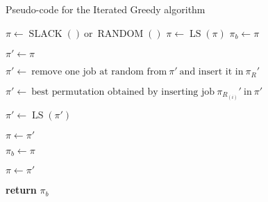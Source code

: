 

\begin{algorithm}
\caption{Pseudo-code for the Iterated Greedy algorithm}
\label{app:alg:ig}
\begin{algorithmic}
	\State $\pi \gets \operatorname{SLACK}() ~\text{or}~ \operatorname{RANDOM}()$
	\State $\pi \gets \operatorname{LS}(\pi)$
	\State $\pi_b \gets \pi$

		\State $\pi' \gets \pi$

			\State $\pi' \gets ~\text{remove one job at random from}~ \pi' ~\text{and insert it in}~ \pi_R'$
		\EndFor

			\State $\pi' \gets ~\text{best permutation obtained by inserting job}~ \pi_{R_{(i)}}' ~\text{in}~ \pi'$
		\EndFor

		\State $\pi' \gets \operatorname{LS}(\pi')$


			\State $\pi \gets \pi'$

				\State $\pi_b \gets \pi$
			\EndIf


			\State $\pi \gets \pi'$

		\EndIf

	\EndWhile
	\State \textbf{return} $\pi_b$
\EndProcedure
\end{algorithmic}
\end{algorithm}